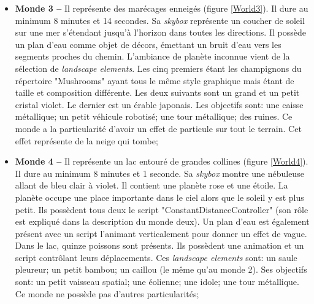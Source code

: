 \begin{itemize}
			\item \textbf{Monde 3 --} Il représente des marécages enneigés (figure \ref{World3}). Il dure au minimum 8 minutes et 14 secondes. Sa \textit{skybox} représente un coucher de soleil sur une mer s'étendant jusqu'à l'horizon dans toutes les directions. Il possède un plan d'eau comme objet de décors, émettant un bruit d'eau vers les segments proches du chemin. L'ambiance de planète inconnue vient de la sélection de \textit{landscape elements}. Les cinq premiers étant les champignons du répertoire "Mushrooms" ayant tous le même style graphique mais étant de taille et composition différente. Les deux suivants sont un grand et un petit cristal violet. Le dernier est un érable japonais. Les objectifs sont: une caisse métallique; un petit véhicule robotisé; une tour métallique; des ruines. Ce monde a la particularité d'avoir un effet de particule sur tout le terrain. Cet effet représente de la neige qui tombe;\medskip		
			
			\begin{minipage}{\linewidth}
				\label{World3}
			\end{minipage}\medskip
			
			\item \textbf{Monde 4 --} Il représente un lac entouré de grandes collines (figure \ref{World4}). Il dure au minimum 8 minutes et 1 seconde. Sa \textit{skybox} montre une nébuleuse allant de bleu clair à violet. Il contient une planète rose et une étoile. La planète occupe une place importante dans le ciel alors que le soleil y est plus petit. Ils possèdent tous deux le script "ConstantDistanceController" (son rôle est expliqué dans la description du monde deux). Un plan d'eau est également présent avec un script l'animant verticalement pour donner un effet de vague. Dans le lac, quinze poissons sont présents. Ils possèdent une animation et un script contrôlant leurs déplacements. Ces \textit{landscape elements} sont: un saule pleureur; un petit bambou; un caillou (le même qu'au monde 2). Ses objectifs sont: un petit vaisseau spatial; une éolienne; une idole; une tour métallique. Ce monde ne possède pas d'autres particularités;\medskip		
			

\end{itemize}
